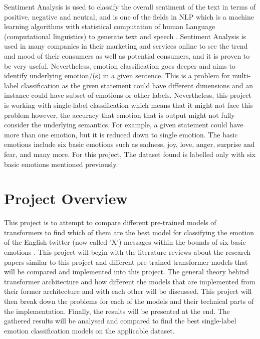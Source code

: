 Sentiment Analysis is used to classify the overall sentiment of the text in terms of positive, negative and neutral, 
and is one of the fields in NLP which is a machine learning algorithms with statistical computation of human Language (computational linguistics) to generate text and speech \cite{IBM_2024}. 
Sentiment Analysis is used in many companies in their marketing and services online to see the trend and mood of their consumers as well as potential consumers, and it is proven to be very useful.
Nevertheless, emotion classification goes deeper and aims to identify underlying emotion/(s) in a given sentence.
This is a problem for multi-label classification as the given statement could have different dimensions and an instance could have subset of emotions or other labels\cite{AMEER2023118534}. Nevertheless, this project is working with single-label classification which means that it might not face this problem however, the accuracy that emotion that is output might not fully consider the underlying semantics.
For example, a given statement could have more than one emotion, but it is reduced down to single emotion.
The basic emotions include six basic emotions such as sadness, joy, love, anger, surprise and fear, and many more.
For this project, The dataset \cite{Pandey_2021} found is labelled only with six basic emotions mentioned previously.

\section{Project Overview}

This project is to attempt to compare different pre-trained models of transformers to find which of them are the best model for classifying the emotion of the English twitter (now called 'X') messages within the bounds of six basic emotions \cite{Pandey_2021}.
This project will begin with the literature reviews about the research papers similar to this project and different pre-trained transformer models that will be compared and implemented into this project. 
The general theory behind transformer architecture and how different the models that are implemented from their former architecture and with each other will be discussed.
This project will then break down the problems for each of the models and their technical parts of the implementation. 
Finally, the results will be presented at the end. The gathered results will be analysed and compared to find the best single-label emotion classification models on the applicable dataset.

